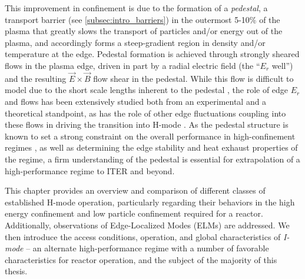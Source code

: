This improvement in confinement is due to the formation of a \emph{pedestal}, a transport barrier (see \cref{subsec:intro_barriers}) in the outermost 5-10\% of the plasma that greatly slows the transport of particles and/or energy out of the plasma, and accordingly forms a steep-gradient region in density and/or temperature at the edge.  Pedestal formation is achieved through strongly sheared flows in the plasma edge, driven in part by a radial electric field (the ``$E_r$ well'') and the resulting $\vec{E} \times \vec{B}$ flow shear in the pedestal.  While this flow is difficult to model due to the short scale lengths inherent to the pedestal \cite{Kagan2010,Landreman2012}, the role of edge $E_r$ and flows has been extensively studied both from an experimental \cite{Groebner1990,Burrell1999,Terry2000,McDermott2009a} and a theoretical \cite{Shaing1989,Biglari1990,Kim1991,Ware1996,Burrell1992} standpoint, as has the role of other edge fluctuations coupling into these flows in driving the transition into H-mode \cite{Schmitz2012}.  As the pedestal structure is known to set a strong constraint on the overall performance in high-confinement regimes \cite{Kinsey2011}, as well as determining the edge stability and heat exhaust properties of the regime, a firm understanding of the pedestal is essential for extrapolation of a high-performance regime to ITER and beyond.

This chapter provides an overview and comparison of different classes of established H-mode operation, particularly regarding their behaviors in the high energy confinement and low particle confinement required for a reactor.  Additionally, observations of Edge-Localized Modes (ELMs) \cite{Zohm1996} are addressed.  We then introduce the access conditions, operation, and global characteristics of \emph{I-mode} -- an alternate high-performance regime with a number of favorable characteristics for reactor operation, and the subject of the majority of this thesis.

